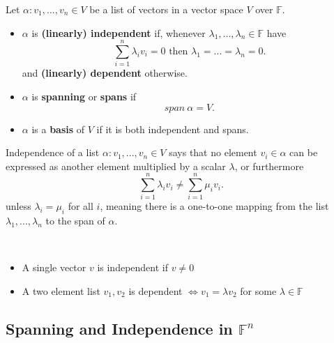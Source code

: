 \begin{definition}
    Let $\alpha : v_1,..., v_n \in V$ be a list of vectors in a vector space $V$ over $\mathbb{F}$.
    \begin{itemize}
    \item $\alpha$ is {\bf (linearly) independent} if, whenever 
      $\lambda_1,...,\lambda_n \in \mathbb{F}$ have
      \[\sum_{i=1}^n \lambda_i v_i = 0 \text{ then } \lambda_1 = ... = \lambda_n = 0.\]
      and {\bf (linearly) dependent} otherwise.
    \item $\alpha$ is {\bf spanning} or {\bf spans} if
      \[span \ \alpha = V.\]
    \item $\alpha$ is a {\bf basis} of $V$ if it is both independent and spans.
    \end{itemize}
\end{definition}

\begin{remark}
    Independence of a list $\alpha : v_1,...,v_n \in V$ says that no element $v_i \in \alpha$ can be expressed as another element multiplied by a scalar $\lambda$, or furthermore
    \[\sum_{i = 1}^n \lambda_i v_i \not = \sum_{i = 1}^n \mu_i v_i.\]
    unless $\lambda_i = \mu_i$ for all $i$, meaning there is a one-to-one mapping from the list $\lambda_1,...,\lambda_n$ to the span of $\alpha$.
\end{remark}

\begin{lemma} $ $
    \begin{itemize}
      \item A single vector $v$ is independent if $v \not = 0$
      \item A two element list $v_1, v_2$ is dependent $\iff v_1 = \lambda v_2$ for some $\lambda \in \mathbb{F}$
    \end{itemize}
\end{lemma}

\subsection{Spanning and Independence in $\mathbb{F}^n$}


